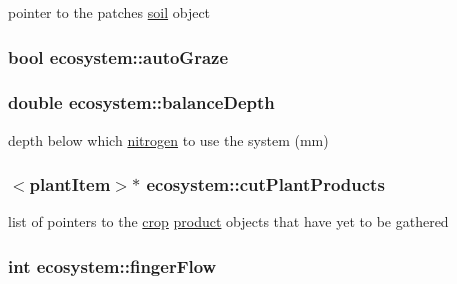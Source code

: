pointer to the patches \hyperlink{classsoil}{soil} object \hypertarget{classecosystem_ae02968a4af70884e35543b24d2f3b17a}{
\subsubsection[{autoGraze}]{\setlength{\rightskip}{0pt plus 5cm}bool {\bf ecosystem::autoGraze}}}
\label{classecosystem_ae02968a4af70884e35543b24d2f3b17a}
\hypertarget{classecosystem_a622df48397a634ab7d4d9df06bf64688}{
\subsubsection[{balanceDepth}]{\setlength{\rightskip}{0pt plus 5cm}double {\bf ecosystem::balanceDepth}}}
\label{classecosystem_a622df48397a634ab7d4d9df06bf64688}


depth below which \hyperlink{classnitrogen}{nitrogen} to use the system (mm) \hypertarget{classecosystem_a5ed20a16967029b1bd8cbd5d03af0223}{
\subsubsection[{cutPlantProducts}]{$<${\bf plantItem}$>$$\ast$ {\bf ecosystem::cutPlantProducts}}}
\label{classecosystem_a5ed20a16967029b1bd8cbd5d03af0223}


list of pointers to the \hyperlink{classcrop}{crop} \hyperlink{classproduct}{product} objects that have yet to be gathered \hypertarget{classecosystem_a27a6796874903c016e6cb3de4ec8a9d2}{
\subsubsection[{fingerFlow}]{\setlength{\rightskip}{0pt plus 5cm}int {\bf ecosystem::fingerFlow}}}
\label{classecosystem_a27a6796874903c016e6cb3de4ec8a9d2}


